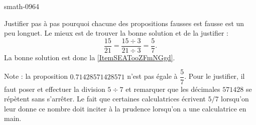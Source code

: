
\begin{corrige}{smath-0964}

    Justifier pas à pas pourquoi chacune des propositions fausses est fausse est un peu longuet. Le mieux est de trouver la bonne solution et de la justifier :
    \begin{equation}
        \frac{ 15 }{ 21 }=\frac{ 15\div 3 }{ 21\div 3 }=\frac{ 5 }{ 7 }.
    \end{equation}
    La bonne solution est donc la \ref{ItemSEATooZFmNGgd}.

    Note : la proposition $ 0.71428571428571$ n'est pas égale à \( \dfrac{ 5 }{ 7 }\). Pour le justifier, il faut poser et effectuer la division \( 5\div 7\) et remarquer que les décimales \( 571428\) se répètent sans s'arrêter. Le fait que certaines calculatrices écrivent \( 5/7\) lorsqu'on leur donne ce nombre doit inciter à la prudence lorsqu'on a une calculatrice en main.

\end{corrige}

